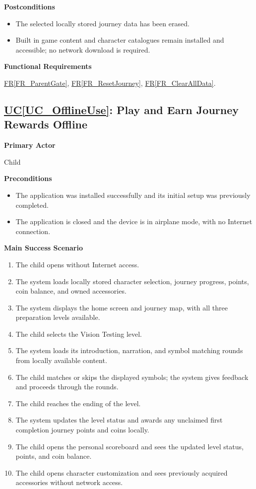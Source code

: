 \documentclass[12pt]{article}
\newcounter{ucnum} %
\newcommand{\ucref}[1]{\hyperref[#1]{UC\ref*{#1}}}
\newcommand{\rref}[1]{\hyperref[#1]{FR\ref*{#1}}}
\begin{document}
\textbf{Postconditions}
\begin{itemize}
    \item The selected locally stored journey data has been erased.
    \item Built in game content and character catalogues remain
    installed and accessible; no network download is required.
\end{itemize}

\textbf{Functional Requirements}

\rref{FR_ParentGate}, \rref{FR_ResetJourney}, \rref{FR_ClearAllData}.

\label{UC_OfflineUse}
\subsection{\ucref{UC_OfflineUse}: Play and Earn Journey Rewards Offline}

\textbf{Primary Actor}

Child

\textbf{Preconditions}
\begin{itemize}
    \item The application was installed successfully and its
    initial setup was previously completed.
    \item The application is closed and the device is in airplane
    mode, with no Internet connection.
\end{itemize}

\textbf{Main Success Scenario}
\begin{enumerate}
    \item The child opens \progname{} without Internet access.
    \item The system loads locally stored character selection,
    journey progress, points, coin balance, and owned accessories.
    \item The system displays the home screen and journey map,
    with all three preparation levels available.
    \item The child selects the Vision Testing level.
    \item The system loads its introduction, narration, and
    symbol matching rounds from locally available content.
    \item The child matches or skips the displayed symbols;
    the system gives feedback and proceeds through the rounds.
    \item The child reaches the ending of the level.
    \item The system updates the level status and awards any
    unclaimed first completion journey points and coins locally.
    \item The child opens the personal scoreboard and sees the
    updated level status, points, and coin balance.
    \item The child opens character customization and sees
    previously acquired accessories without network access.
\end{enumerate}
\end{document}
